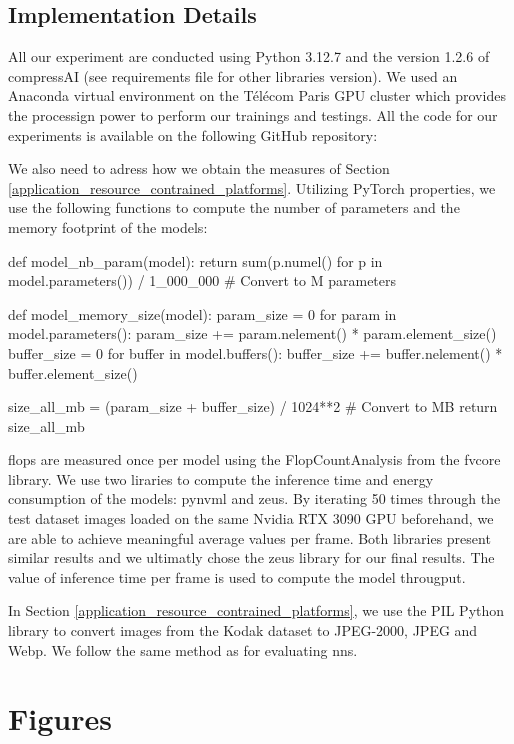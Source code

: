 \documentclass{article}
\begin{document}
\subsection{Implementation Details}
All our experiment are conducted using Python 3.12.7 and the version 1.2.6 of compressAI (see requirements file for other libraries version). We used an Anaconda virtual environment on the Télécom Paris GPU cluster which provides the processign power to perform our trainings and testings. All the code for our experiments is available on the following GitHub repository: \url{}

We also need to adress how we obtain the measures of Section \ref{application_resource_contrained_platforms}. Utilizing PyTorch properties, we use the following functions to compute the number of parameters and the memory footprint of the models:

\begin{pythonCode}
def model_nb_param(model):
    return sum(p.numel() for p in model.parameters()) / 1_000_000 # Convert to M parameters


def model_memory_size(model):
    param_size = 0
    for param in model.parameters():
        param_size += param.nelement() * param.element_size()
    buffer_size = 0
    for buffer in model.buffers():
        buffer_size += buffer.nelement() * buffer.element_size()

    size_all_mb = (param_size + buffer_size) / 1024**2 # Convert to MB
    return size_all_mb
\end{pythonCode}

\acrshort{flop}s are measured once per model using the \textsf{FlopCountAnalysis} from the fvcore library. We use two liraries to compute the inference time and energy consumption of the models: pynvml and zeus. By iterating 50 times through the test dataset images loaded on the same Nvidia RTX 3090 GPU beforehand, we are able to achieve meaningful average values per frame. Both libraries present similar results and we ultimatly chose the zeus library for our final results. The value of inference time per frame is used to compute the model througput.

In Section \ref{application_resource_contrained_platforms}, we use the PIL Python library to convert images from the Kodak dataset to JPEG-2000, JPEG and Webp. We follow the same method as for evaluating \acrshort{nn}s.

\section{Figures}
\end{document}
